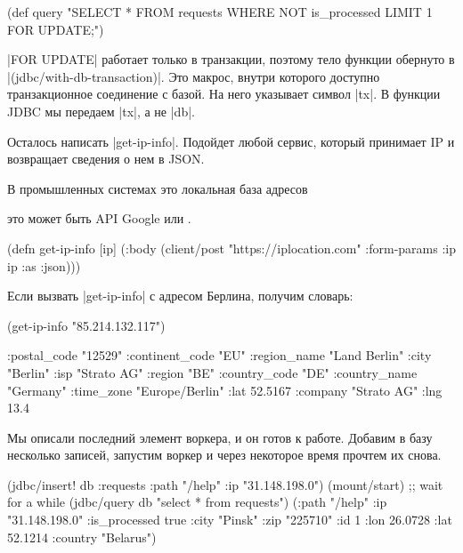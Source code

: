 \begin{english}
  \begin{clojure}
(def query
  "SELECT * FROM requests
   WHERE NOT is_processed
   LIMIT 1 FOR UPDATE;")
  \end{clojure}
\end{english}

\spverb|FOR UPDATE| работает только в транзакции, поэтому тело функции обернуто
в \spverb|(jdbc/with-db-transaction)|. Это макрос, внутри которого доступно
транзакционное соединение с базой. На него указывает символ \spverb|tx|. В
функции JDBC мы передаем \spverb|tx|, а не \spverb|db|.


Осталось написать \spverb|get-ip-info|. Подойдет любой сервис, который принимает
IP и возвращает сведения о нем в JSON.


В промышленных системах это локальная
база адресов

это может быть
API Google или .

\begin{english}
  \begin{clojure}
(defn get-ip-info [ip]
  (:body (client/post "https://iplocation.com"
                      {:form-params {:ip ip}
                       :as :json})))
  \end{clojure}
\end{english}

Если вызвать \spverb|get-ip-info| с адресом Берлина, получим словарь:

\begin{english}
  \begin{clojure}
(get-ip-info "85.214.132.117")

{:postal_code "12529"
 :continent_code "EU"
 :region_name "Land Berlin"
 :city "Berlin"
 :isp "Strato AG"
 :region "BE"
 :country_code "DE"
 :country_name "Germany"
 :time_zone "Europe/Berlin"
 :lat 52.5167
 :company "Strato AG"
 :lng 13.4}
  \end{clojure}
\end{english}

Мы описали последний элемент воркера, и он готов к работе. Добавим в базу
несколько записей, запустим воркер и через некоторое время прочтем их снова.

\begin{english}
  \begin{clojure}
(jdbc/insert! db :requests {:path "/help" :ip "31.148.198.0"})
(mount/start)
;; wait for a while
(jdbc/query db "select * from requests")
({:path "/help" :ip "31.148.198.0" :is_processed true
  :city "Pinsk" :zip "225710" :id 1
  :lon 26.0728 :lat 52.1214 :country "Belarus"})
  \end{clojure}
\end{english}

